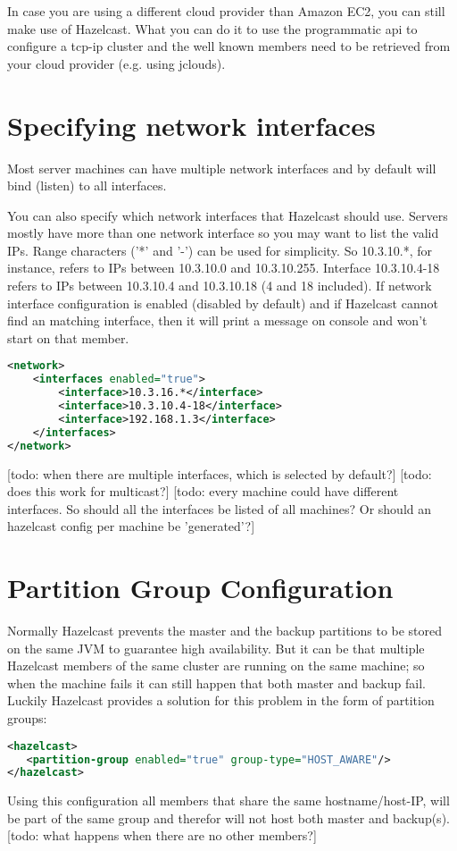 In case you are using a different cloud provider than Amazon EC2, you can still make use of Hazelcast. What you can do it to use the programmatic api to configure a tcp-ip cluster and the well known members need to be retrieved from your cloud provider (e.g. using jclouds).

\section{Specifying network interfaces}
Most server machines can have multiple network interfaces and by default will bind (listen) to all interfaces.

You can also specify which network interfaces that Hazelcast should use. Servers mostly have more than one network interface so you may want to list the valid IPs. Range characters ('*' and '-') can be used for simplicity. So 10.3.10.*, for instance, refers to IPs between 10.3.10.0 and 10.3.10.255. Interface 10.3.10.4-18 refers to IPs between 10.3.10.4 and 10.3.10.18 (4 and 18 included). If network interface configuration is enabled (disabled by default) and if Hazelcast cannot find an matching interface, then it will print a message on console and won't start on that member.

\begin{lstlisting}[language=xml]
<network>
    <interfaces enabled="true">
        <interface>10.3.16.*</interface> 
        <interface>10.3.10.4-18</interface> 
        <interface>192.168.1.3</interface>         
    </interfaces>    
</network>
\end{lstlisting}

[todo: when there are multiple interfaces, which is selected by default?]
[todo: does this work for multicast?]
[todo: every machine could have different interfaces. So should all the interfaces be listed of all machines? Or should an hazelcast config per machine be 'generated'?]

\section{Partition Group Configuration}
Normally Hazelcast prevents the master and the backup partitions to be stored on the same JVM to guarantee high availability. But it can be that multiple Hazelcast members of the same cluster are running on the same machine; so when the machine fails it can still happen that both master and backup fail. Luckily Hazelcast provides a solution for this problem in the form of partition groups:
\begin{lstlisting}[language=xml]
<hazelcast>
   <partition-group enabled="true" group-type="HOST_AWARE"/>
</hazelcast>
\end{lstlisting}
Using this configuration all members that share the same hostname/host-IP, will be part of the same group and therefor will not host both master and backup(s). [todo: what happens when there are no other members?] 

